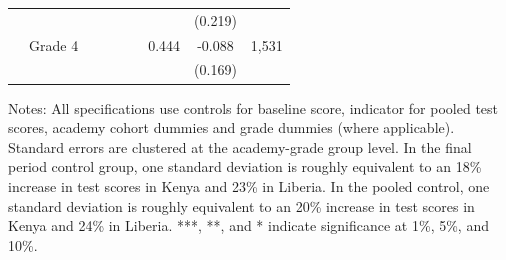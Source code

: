 \begin{center}
\begin{scriptsize}
\begin{threeparttable}
\begin{tabular} {@{} l l c c c c c c c @{}}
&                & &  &&&&(0.219)&  \\
&Grade 4 & & & &&0.444&-0.088&1,531 \\
&                & &  &&&&(0.169)&  \\
\midrule
\bottomrule
\end{tabular}
\begin{tablenotes}
\item Notes: All specifications use controls for baseline score, indicator for pooled test scores, academy cohort dummies and grade dummies (where applicable). Standard errors are clustered at the academy-grade group level. In the final period control group, one standard deviation is roughly equivalent to an 18\% increase in test scores in Kenya and 23\% in Liberia. In the pooled control, one standard deviation is roughly equivalent to an 20\% increase in test scores in Kenya and 24\% in Liberia. ***, **, and * indicate significance at 1\%, 5\%, and 10\%. \end{tablenotes}
\end{threeparttable}
\end{scriptsize}
\end{center}
\clearpage
